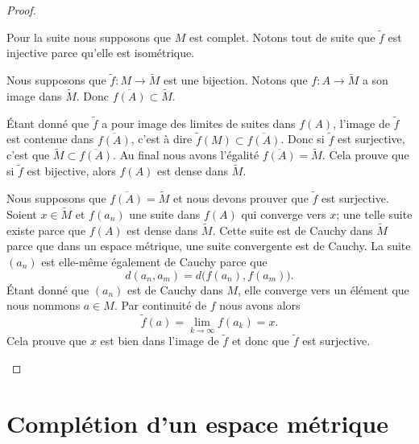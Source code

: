 \begin{proof}
\begin{subproof}
		Pour la suite nous supposons que \( M\) est complet. Notons tout de suite que \( \tilde f\) est injective parce qu'elle est isométrique.


		Nous supposons que \( \tilde f\colon M\to \tilde M\) est une bijection. Notons que \(f \colon A\to \tilde M \) a son image dans \( \tilde M\). Donc \( \overline{f(A)}\subset \tilde M\).

		Étant donné que \( \tilde f\) a pour image des limites de suites dans \( f(A)\), l'image de \( \tilde f\) est contenue dans \( \overline{ f(A) }\), c'est à dire \( \tilde f(M)\subset\overline{f(A)} \). Donc si \( \tilde f\) est surjective, c'est que \( \tilde M\subset \overline{ f(A) }\). Au final nous avons l'égalité \( \overline{ f(A) }=\tilde M\). Cela prouve que si \( \tilde f\) est bijective, alors \( f(A)\) est dense dans \( \tilde M\).



		Nous supposons que \( \overline{ f(A) }=\tilde M\) et nous devons prouver que \( \tilde f\) est surjective. Soient \( x\in \tilde M\) et \( f(a_n)\) une suite dans \( f(A)\) qui converge vers \( x\); une telle suite existe parce que \( f(A)\) est dense dans \( \tilde M\). Cette suite est de Cauchy dans \( \tilde M\) parce que dans un espace métrique, une suite convergente est de Cauchy. La suite \( (a_n)\) est elle-même également de Cauchy parce que
		\begin{equation}
			d(a_n,a_m)=d\big( f(a_n),f(a_m) \big).
		\end{equation}
		Étant donné que \( (a_n)\) est de Cauchy dans \( M\), elle converge vers un élément que nous nommons \( a\in M\). Par continuité de \( f \) nous avons alors
		\begin{equation}
			\tilde f(a)=\lim_{k\to \infty} f(a_k)=x.
		\end{equation}
		Cela prouve que \( x\) est bien dans l'image de \( \tilde f\) et donc que \( \tilde f\) est surjective.
	\end{subproof}
\end{proof}

\section{Complétion d'un espace métrique}


